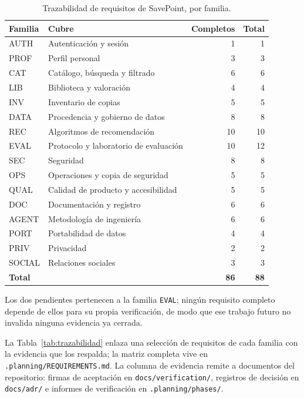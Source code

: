 \begin{table}[H]
\centering
\caption{Trazabilidad de requisitos de SavePoint, por familia.}\label{tab:trazabilidad-familias}
\tablecompact
\begin{tabularx}{\textwidth}{@{}>{\ttfamily\raggedright\arraybackslash}p{}Yrr@{}}
\textnormal{Familia} & \textnormal{Cubre} & \textnormal{Completos} & \textnormal{Total} \\
\hline
AUTH & Autenticación y sesión & 1 & 1 \\
PROF & Perfil personal & 3 & 3 \\
CAT & Catálogo, búsqueda y filtrado & 6 & 6 \\
LIB & Biblioteca y valoración & 4 & 4 \\
INV & Inventario de copias & 5 & 5 \\
DATA & Procedencia y gobierno de datos & 8 & 8 \\
REC & Algoritmos de recomendación & 10 & 10 \\
EVAL & Protocolo y laboratorio de evaluación & 10 & 12 \\
SEC & Seguridad & 8 & 8 \\
OPS & Operaciones y copia de seguridad & 5 & 5 \\
QUAL & Calidad de producto y accesibilidad & 5 & 5 \\
DOC & Documentación y registro & 6 & 6 \\
AGENT & Metodología de ingeniería & 6 & 6 \\
PORT & Portabilidad de datos & 4 & 4 \\
PRIV & Privacidad & 2 & 2 \\
SOCIAL & Relaciones sociales & 3 & 3 \\
\hline
\textbf{Total} & & \textbf{86} & \textbf{88} \\
\end{tabularx}
\end{table}

Los dos pendientes pertenecen a la familia \texttt{EVAL}; ningún requisito completo depende
de ellos para su propia verificación, de modo que ese trabajo futuro no invalida ninguna
evidencia ya cerrada.

La Tabla~\ref{tab:trazabilidad} enlaza una selección de requisitos de cada familia con la evidencia que los
respalda; la matriz completa vive en \texttt{.planning/REQUIREMENTS.md}. La columna de evidencia remite a documentos del repositorio: firmas de aceptación
en \texttt{docs/verification/}, registros de decisión en \texttt{docs/adr/} e informes de
verificación en \texttt{.planning/phases/}.

